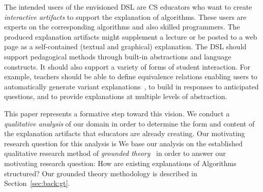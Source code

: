 \documentclass[sigconf]{acmart}
\begin{document}
The intended users of the envisioned DSL are CS educators who want to create
\emph{interactive artifacts} to support the explanation of algorithms. These
users are experts on the corresponding algorithms and also skilled
programmers. The produced explanation artifacts might supplement a lecture or
be posted to a web page as a self-contained (textual and graphical)
explanation.
%
The DSL should support pedagogical methods through built-in
abstractions and language constructs. It should also support a variety of forms
of student interaction. For example, teachers should be able to define
equivalence relations enabling users to automatically generate variant
explanations~\cite{EW13jvlc}, to build in responses to anticipated
questions, and to provide explanations at multiple levels of abstraction.


This paper represents a formative step toward this vision. We conduct a
\emph{qualitative analysis} of our domain in order to determine the form and
content of the explanation artifacts that educators are already creating.
%
Our motivating research question for this analysis is 
%
We base our analysis on the established qualitative research method of
\emph{grounded theory}~\cite{Strauss67discoveryof} in order to answer our
motivating research question: How are existing explanations of Algorithms
structured? Our grounded theory methodology is described in
Section~\ref{sec:back:gt}.
\end{document}

